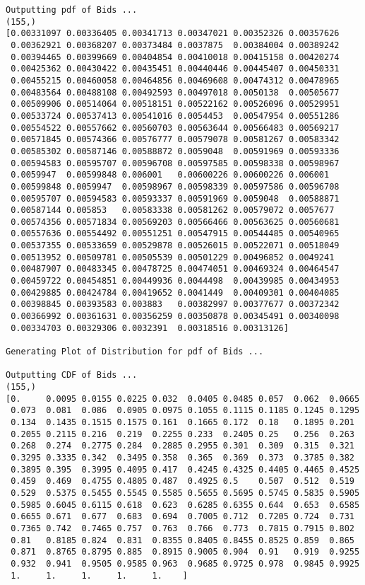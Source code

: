 \documentclass{article}
\begin{document}
\begin{lstlisting}
Outputting pdf of Bids ...
(155,)
[0.00331097 0.00336405 0.00341713 0.00347021 0.00352326 0.00357626
 0.00362921 0.00368207 0.00373484 0.0037875  0.00384004 0.00389242
 0.00394465 0.00399669 0.00404854 0.00410018 0.00415158 0.00420274
 0.00425362 0.00430422 0.00435451 0.00440446 0.00445407 0.00450331
 0.00455215 0.00460058 0.00464856 0.00469608 0.00474312 0.00478965
 0.00483564 0.00488108 0.00492593 0.00497018 0.0050138  0.00505677
 0.00509906 0.00514064 0.00518151 0.00522162 0.00526096 0.00529951
 0.00533724 0.00537413 0.00541016 0.0054453  0.00547954 0.00551286
 0.00554522 0.00557662 0.00560703 0.00563644 0.00566483 0.00569217
 0.00571845 0.00574366 0.00576777 0.00579078 0.00581267 0.00583342
 0.00585302 0.00587146 0.00588872 0.0059048  0.00591969 0.00593336
 0.00594583 0.00595707 0.00596708 0.00597585 0.00598338 0.00598967
 0.0059947  0.00599848 0.006001   0.00600226 0.00600226 0.006001
 0.00599848 0.0059947  0.00598967 0.00598339 0.00597586 0.00596708
 0.00595707 0.00594583 0.00593337 0.00591969 0.0059048  0.00588871
 0.00587144 0.005853   0.00583338 0.00581262 0.00579072 0.0057677
 0.00574356 0.00571834 0.00569203 0.00566466 0.00563625 0.00560681
 0.00557636 0.00554492 0.00551251 0.00547915 0.00544485 0.00540965
 0.00537355 0.00533659 0.00529878 0.00526015 0.00522071 0.00518049
 0.00513952 0.00509781 0.00505539 0.00501229 0.00496852 0.0049241
 0.00487907 0.00483345 0.00478725 0.00474051 0.00469324 0.00464547
 0.00459722 0.00454851 0.00449936 0.0044498  0.00439985 0.00434953
 0.00429885 0.00424784 0.00419652 0.0041449  0.00409301 0.00404085
 0.00398845 0.00393583 0.003883   0.00382997 0.00377677 0.00372342
 0.00366992 0.00361631 0.00356259 0.00350878 0.00345491 0.00340098
 0.00334703 0.00329306 0.0032391  0.00318516 0.00313126]

Generating Plot of Distribution for pdf of Bids ...

Outputting CDF of Bids ...
(155,)
[0.     0.0095 0.0155 0.0225 0.032  0.0405 0.0485 0.057  0.062  0.0665
 0.073  0.081  0.086  0.0905 0.0975 0.1055 0.1115 0.1185 0.1245 0.1295
 0.134  0.1435 0.1515 0.1575 0.161  0.1665 0.172  0.18   0.1895 0.201
 0.2055 0.2115 0.216  0.219  0.2255 0.233  0.2405 0.25   0.256  0.263
 0.268  0.274  0.2775 0.284  0.2885 0.2955 0.301  0.309  0.315  0.321
 0.3295 0.3335 0.342  0.3495 0.358  0.365  0.369  0.373  0.3785 0.382
 0.3895 0.395  0.3995 0.4095 0.417  0.4245 0.4325 0.4405 0.4465 0.4525
 0.459  0.469  0.4755 0.4805 0.487  0.4925 0.5    0.507  0.512  0.519
 0.529  0.5375 0.5455 0.5545 0.5585 0.5655 0.5695 0.5745 0.5835 0.5905
 0.5985 0.6045 0.6115 0.618  0.623  0.6285 0.6355 0.644  0.653  0.6585
 0.6655 0.671  0.677  0.683  0.694  0.7005 0.712  0.7205 0.724  0.731
 0.7365 0.742  0.7465 0.757  0.763  0.766  0.773  0.7815 0.7915 0.802
 0.81   0.8185 0.824  0.831  0.8355 0.8405 0.8455 0.8525 0.859  0.865
 0.871  0.8765 0.8795 0.885  0.8915 0.9005 0.904  0.91   0.919  0.9255
 0.932  0.941  0.9505 0.9585 0.963  0.9685 0.9725 0.978  0.9845 0.9925
 1.     1.     1.     1.     1.    ]


\end{lstlisting}
\end{document}

